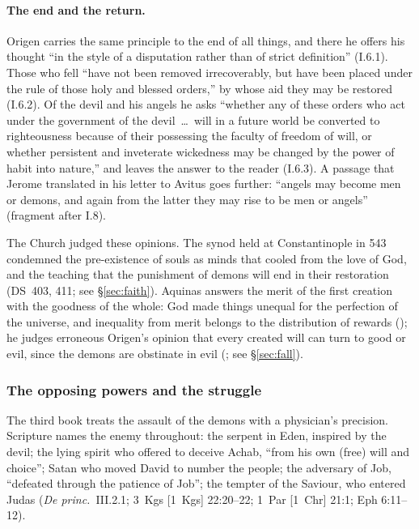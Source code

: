 \paragraph{The end and the return.} Origen carries the same principle to the
end of all things, and there he offers his thought ``in the style of a
disputation rather than of strict definition'' (I.6.1). Those who fell
``have not been removed irrecoverably, but have been placed under the rule
of those holy and blessed orders,'' by whose aid they may be restored
(I.6.2). Of the devil and his angels he asks ``whether any of these orders
who act under the government of the devil~\dots\ will in a future world be
converted to righteousness because of their possessing the faculty of
freedom of will, or whether persistent and inveterate wickedness may be
changed by the power of habit into nature,'' and leaves the answer to the
reader (I.6.3). A passage that Jerome translated in his letter to Avitus goes further:
``angels may become men or demons, and again from the latter they may rise
to be men or angels'' (fragment after I.8).

The Church judged these opinions. The synod held at Constantinople in 543
condemned the pre-existence of souls as minds that cooled from the love of
God, and the teaching that the punishment of demons will end in their
restoration (DS~403, 411; see \S\ref{sec:faith}). Aquinas answers the merit
of the first creation with the goodness of the whole: God made things
unequal for the perfection of the universe, and inequality from merit
belongs to the distribution of rewards (); he
judges erroneous Origen's opinion that every created will can turn to good
or evil, since the demons are obstinate in evil (; see
\S\ref{sec:fall}).

\subsubsection{The opposing powers and the struggle}

The third book treats the assault of the demons with a physician's
precision. Scripture names the enemy throughout: the serpent in Eden, inspired by
the devil; the lying spirit who offered to deceive Achab, ``from his own
(free) will and choice''; Satan who moved David to number the people; the
adversary of Job, ``defeated through the patience of Job''; the tempter of
the Saviour, who entered Judas (\emph{De princ.}\ III.2.1; 3~Kgs [1~Kgs]
22:20--22; 1~Par [1~Chr] 21:1; Eph 6:11--12).

